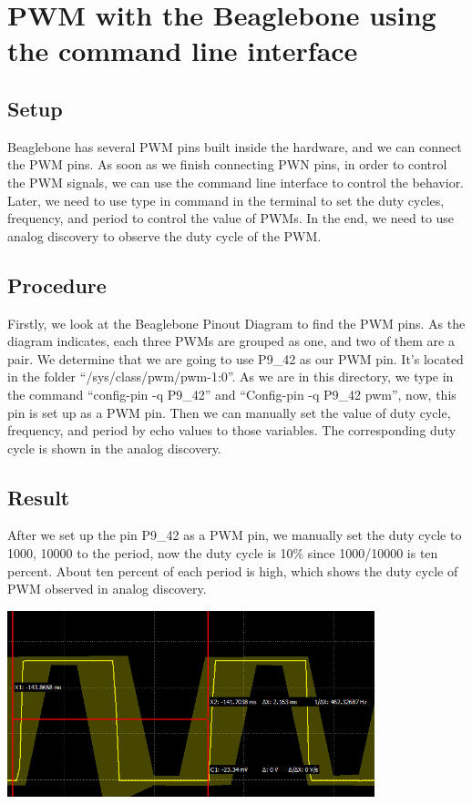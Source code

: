 \documentclass{article}
\begin{document}
\section{PWM with the Beaglebone using the command line interface}
\subsection{Setup}
Beaglebone has several PWM pins built inside the hardware, and we can connect the PWM pins. As soon as we finish connecting PWN pins, in order to control the PWM signals, we can use the command line interface to control the behavior. Later, we need to use type in command in the terminal to set the duty cycles, frequency, and period to control the value of PWMs. In the end, we need to use analog discovery to observe the duty cycle of the PWM.
\subsection{Procedure}
Firstly, we look at the Beaglebone Pinout Diagram to find the PWM pins. As the diagram indicates, each three PWMs are grouped as one, and two of them are a pair. We determine that we are going to use P9\_42 as our PWM pin. It’s located in the folder “/sys/class/pwm/pwm-1:0”. As we are in this directory, we type in the command “config-pin -q P9\_42” and “Config-pin -q P9\_42 pwm”, now, this pin is set up as a PWM pin. Then we can manually set the value of duty cycle, frequency, and period by echo values to those variables. The corresponding duty cycle is shown in the analog discovery. 
\subsection{Result}
After we set up the pin P9\_42 as a PWM pin, we manually set the duty cycle to 1000, 10000 to the period, now the duty cycle is 10\% since 1000/10000 is ten percent. About ten percent of each period is high, which shows the duty cycle of PWM observed in analog discovery. 
\begin{center}
	\includegraphics[width=0.8\textwidth]{img/Lab1_9.PNG}
\end{center}
\clearpage
\end{document}
